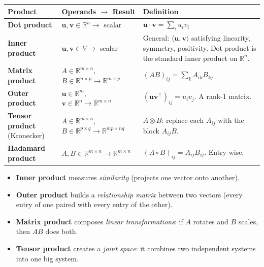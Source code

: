 \documentclass[11pt,a4paper]{article}
\newcommand{\R}{\mathbb{R}}
\begin{document}
\begin{center}
\small
\begin{tabular}{@{}lp{4cm}p{5.5cm}@{}}
\toprule
\textbf{Product} & \textbf{Operands $\to$ Result} & \textbf{Definition} \\
\midrule
\textbf{Dot product} & $\mathbf{u}, \mathbf{v} \in \R^n \to$ scalar & $\mathbf{u} \cdot \mathbf{v} = \sum_i u_i v_i$ \\
\textbf{Inner product} & $\mathbf{u}, \mathbf{v} \in V \to$ scalar & General: $\langle \mathbf{u}, \mathbf{v} \rangle$ satisfying linearity, symmetry, positivity.  Dot product is the standard inner product on $\R^n$. \\
\textbf{Matrix product} & $A \in \R^{m \times n}$, $B \in \R^{n \times p} \to \R^{m \times p}$ & $(AB)_{ij} = \sum_k A_{ik}B_{kj}$ \\
\textbf{Outer product} & $\mathbf{u} \in \R^m$, $\mathbf{v} \in \R^n \to \R^{m \times n}$ & $(\mathbf{u}\mathbf{v}^\top)_{ij} = u_i v_j$.  A rank-1 matrix. \\
\textbf{Tensor product} (Kronecker) & $A \in \R^{m \times n}$, $B \in \R^{p \times q} \to \R^{mp \times nq}$ & $A \otimes B$: replace each $A_{ij}$ with the block $A_{ij}B$.  \\
\textbf{Hadamard product} & $A, B \in \R^{m \times n} \to \R^{m \times n}$ & $(A \circ B)_{ij} = A_{ij} B_{ij}$.  Entry-wise. \\
\bottomrule
\end{tabular}
\end{center}

\begin{intuitionbox}
\begin{itemize}[nosep]
  \item \textbf{Inner product} measures \emph{similarity} (projects one vector onto another).
  \item \textbf{Outer product} builds a \emph{relationship matrix} between two vectors (every entry of one paired with every entry of the other).
  \item \textbf{Matrix product} composes \emph{linear transformations}: if $A$ rotates and $B$ scales, then $AB$ does both.
  \item \textbf{Tensor product} creates a \emph{joint space}: it combines two independent systems into one big system.
\end{itemize}
\end{intuitionbox}


\end{document}
